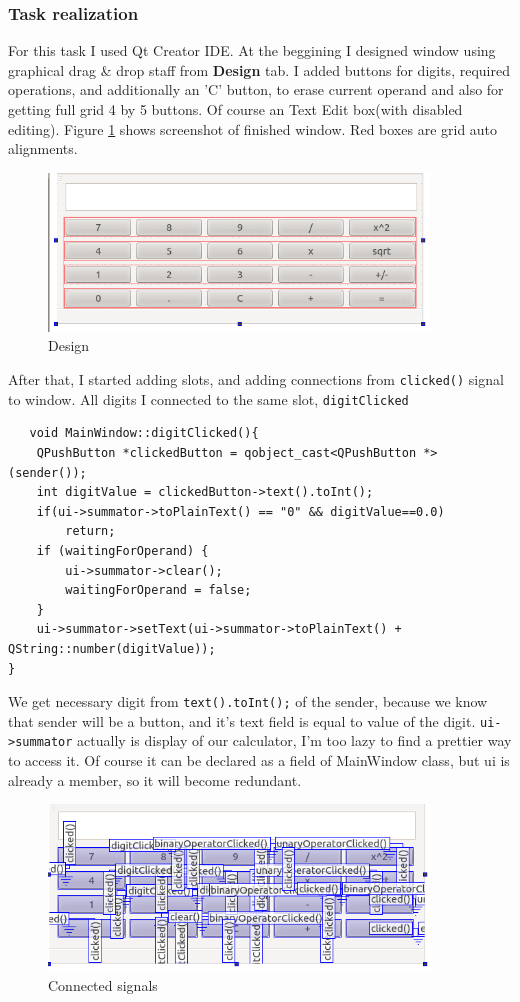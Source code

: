 \subsubsection{Task realization}
For this task I used Qt Creator IDE. At the beggining I designed window using graphical drag \& drop staff from \textbf{Design} tab.
I added buttons for digits, required operations, and additionally an 'C' button, to erase current operand and also for getting
full grid 4 by 5 buttons. Of course an Text Edit box(with disabled editing). Figure \ref{fig:design} shows screenshot of finished
window. Red boxes are grid auto alignments.
\begin{figure}[H]
    \centering
    \includegraphics[width=0.9\textwidth]{screen1.png}
    \caption{Design}
    \label{fig:design}
\end{figure}

After that, I started adding slots, and adding connections from \texttt{clicked()} signal to window. All digits I connected 
to the same slot, \texttt{digitClicked}
\begin{verbatim}
   void MainWindow::digitClicked(){
    QPushButton *clickedButton = qobject_cast<QPushButton *>(sender());
    int digitValue = clickedButton->text().toInt();
    if(ui->summator->toPlainText() == "0" && digitValue==0.0)
        return;
    if (waitingForOperand) {
        ui->summator->clear();
        waitingForOperand = false;
    }
    ui->summator->setText(ui->summator->toPlainText() + QString::number(digitValue));
} 
\end{verbatim}
We get necessary digit from \texttt{text().toInt();} of the sender, because we know that sender will be a button, and it's 
text field is equal to value of the digit. \texttt{ui->summator} actually is display of our calculator, I'm too lazy to find
a prettier way to access it. Of course it can be declared as a field of MainWindow class, but ui is already a member, so it 
will become redundant. 

\begin{figure}[H]
    \centering
    \includegraphics[width=0.9\textwidth]{screen2.png}
    \caption{Connected signals}
    \label{fig:signals}
\end{figure}

